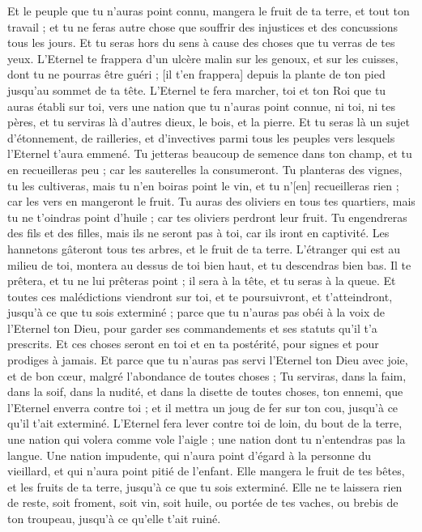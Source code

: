 \begin{multicols}{2}
Et le peuple que tu n'auras point connu, mangera le fruit de ta terre, et tout ton travail ; et tu ne feras autre chose que souffrir des injustices et des concussions tous les jours.
Et tu seras hors du sens à cause des choses que tu verras de tes yeux.
L'Eternel te frappera d'un ulcère malin sur les genoux, et sur les cuisses, dont tu ne pourras être guéri ; [il t'en frappera] depuis la plante de ton pied jusqu'au sommet de ta tête.
L'Eternel te fera marcher, toi et ton Roi que tu auras établi sur toi, vers une nation que tu n'auras point connue, ni toi, ni tes pères, et tu serviras là d'autres dieux, le bois, et la pierre.
Et tu seras là un sujet d'étonnement, de railleries, et d'invectives parmi tous les peuples vers lesquels l'Eternel t'aura emmené.
Tu jetteras beaucoup de semence dans ton champ, et tu en recueilleras peu ; car les sauterelles la consumeront.
Tu planteras des vignes, tu les cultiveras, mais tu n'en boiras point le vin, et tu n'[en] recueilleras rien ; car les vers en mangeront le fruit.
Tu auras des oliviers en tous tes quartiers, mais tu ne t'oindras point d'huile ; car tes oliviers perdront leur fruit.
Tu engendreras des fils et des filles, mais ils ne seront pas à toi, car ils iront en captivité.
Les hannetons gâteront tous tes arbres, et le fruit de ta terre.
L'étranger qui est au milieu de toi, montera au dessus de toi bien haut, et tu descendras bien bas.
Il te prêtera, et tu ne lui prêteras point ; il sera à la tête, et tu seras à la queue.
Et toutes ces malédictions viendront sur toi, et te poursuivront, et t'atteindront, jusqu'à ce que tu sois exterminé ; parce que tu n'auras pas obéi à la voix de l'Eternel ton Dieu, pour garder ses commandements et ses statuts qu'il t'a prescrits.
Et ces choses seront en toi et en ta postérité, pour signes et pour prodiges à jamais.
Et parce que tu n'auras pas servi l'Eternel ton Dieu avec joie, et de bon cœur, malgré l'abondance de toutes choses ;
Tu serviras, dans la faim, dans la soif, dans la nudité, et dans la disette de toutes choses, ton ennemi, que l'Eternel enverra contre toi ; et il mettra un joug de fer sur ton cou, jusqu'à ce qu'il t'ait exterminé.
L'Eternel fera lever contre toi de loin, du bout de la terre, une nation qui volera comme vole l'aigle ; une nation dont tu n'entendras pas la langue.
Une nation impudente, qui n'aura point d'égard à la personne du vieillard, et qui n'aura point pitié de l'enfant.
Elle mangera le fruit de tes bêtes, et les fruits de ta terre, jusqu'à ce que tu sois exterminé. Elle ne te laissera rien de reste, soit froment, soit vin, soit huile, ou portée de tes vaches, ou brebis de ton troupeau, jusqu'à ce qu'elle t'ait ruiné.

\end{multicols}
